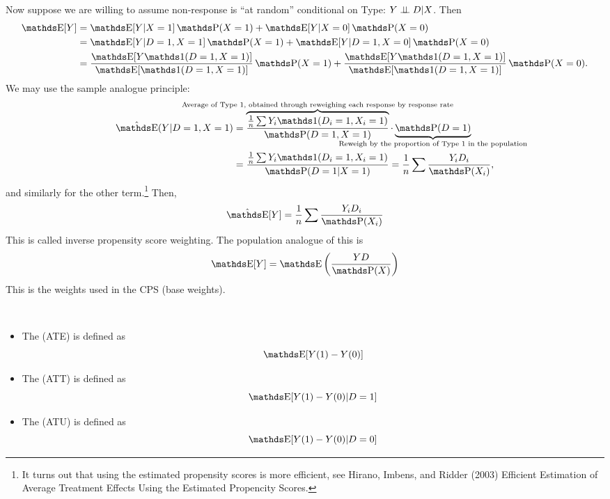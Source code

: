 \documentclass[letterpaper, 10pt]{article}
\begin{document}
\begin{example}
  Now suppose we are willing to assume non-response is ``at random'' conditional on Type: \(Y \perp \!\!\! \perp D | X\).
  Then
  \begin{align*}
    \E[Y]
    &= \E[Y|X = 1]\P(X = 1) + \E[Y|X = 0]\P(X = 0) \\
    &= \E[Y|D = 1, X = 1]\P(X = 1) + \E[Y|D = 1, X = 0]\P(X = 0) \\
    &= \frac{\E[Y\ind(D = 1, X = 1)]}{\E[\ind(D = 1, X = 1)]} \P(X = 1)
    + \frac{\E[Y\ind(D = 1, X = 1)]}{\E[\ind(D = 1, X = 1)]} \P(X = 0).
  \end{align*}
  We may use the sample analogue principle:
  \begin{align*}
    \hat{\E}(Y|D = 1, X = 1)
    &= \overbrace{\frac{\frac{1}{n} \sum Y_i \ind(D_i = 1, X_i = 1)}{\P(D = 1, X = 1)}}^{\mathclap{\text{Average of Type 1, obtained through reweighing each response by response rate}}} \cdot \underbrace{\P(D = 1)}_{\mathclap{\text{Reweigh by the proportion of Type 1 in the population}}} \\
    &= \frac{\frac{1}{n} \sum Y_i \ind(D_i = 1, X_i = 1)}{\P(D = 1|X = 1)}
    = \frac{1}{n} \sum \frac{Y_i D_i}{\P(X_i)},
  \end{align*}
  and similarly for the other term.\footnote{It turns out that using the estimated propensity scores is more efficient, see Hirano, Imbens, and Ridder (2003) Efficient Estimation of Average Treatment Effects Using the Estimated Propencity Scores.}
  Then,
  \[
    \hat{\E}[Y]
    = \frac{1}{n} \sum \frac{Y_i D_i}{\P(X_i)}
  \]
  This is called inverse propensity score weighting.
  The population analogue of this is
  \[
    \E[Y]
    = \E\left( \frac{YD}{\P(X)} \right) 
  \]
  This is the weights used in the CPS (base weights).
\end{example}


\begin{definition}~
  \begin{itemize}
    \item The  (ATE) is defined as
      \[
        \E[Y(1) - Y(0)]
      \]
    \item The  (ATT) is defined as
      \[
        \E[Y(1) - Y(0)|D = 1]
      \]
    \item The  (ATU) is defined as
      \[
        \E[Y(1) - Y(0)|D = 0]
      \]
  \end{itemize}
\end{definition}
\end{document}
